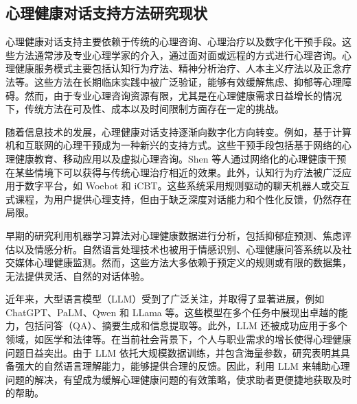 \subsection{心理健康对话支持方法研究现状}

心理健康对话支持主要依赖于传统的心理咨询、心理治疗以及数字化干预手段。这些方法通常涉及专业心理学家的介入，通过面对面或远程的方式进行心理咨询。心理健康服务模式主要包括认知行为疗法、精神分析治疗、人本主义疗法以及正念疗法等\cite{Colby_Ortony_Clore_Collins_1989}\cite{Rogers}。这些方法在长期临床实践中被广泛验证，能够有效缓解焦虑、抑郁等心理障碍。然而，由于专业心理咨询资源有限，尤其是在心理健康需求日益增长的情况下，传统方法在可及性、成本以及时间限制方面存在一定的挑战\cite{Kazdin_Blase_2011}。

随着信息技术的发展，心理健康对话支持逐渐向数字化方向转变。例如，基于计算机和互联网的心理干预成为一种新兴的支持方式。这些干预手段包括基于网络的心理健康教育、移动应用以及虚拟心理咨询。Shen\cite{Shen_Rudzicz_2017} 等人通过网络化的心理健康干预在某些情境下可以获得与传统心理治疗相近的效果。此外，认知行为疗法被广泛应用于数字平台，如 Woebot\cite{Fitzpatrick_Darcy_Vierhile_2017} 和 iCBT\cite{Williams_Andrews_2013}。这些系统采用规则驱动的聊天机器人或交互式课程，为用户提供心理支持，但由于缺乏深度对话能力和个性化反馈，仍然存在局限。

早期的研究利用机器学习算法对心理健康数据进行分析，包括抑郁症预测、焦虑评估以及情感分析\cite{Shen_Rudzicz_2017}。自然语言处理技术也被用于情感识别、心理健康问答系统以及社交媒体心理健康监测\cite{Guntuku_Yaden_Kern_Ungar_Eichstaedt_2017}。然而，这些方法大多依赖于预定义的规则或有限的数据集，无法提供灵活、自然的对话体验。

近年来，大型语言模型（LLM）受到了广泛关注，并取得了显著进展，例如 ChatGPT、PaLM\cite{Chowdhery_Narang_Devlin_Bosma_Mishra_Roberts_Barham_Chung_Sutton_Gehrmann_etal}、Qwen\cite{Bai_Bai_Chu_Cui_Dang_Deng_Fan_Ge_Han_Huang_et} 和 LLama\cite{Touvron_Lavril_Izacard_Martinet_Lachaux_Lacroix_Roziere_Goyal_Hambro_Azhar_et} 等。这些模型在多个任务中展现出卓越的能力，包括问答（QA）、摘要生成和信息提取等。此外，LLM 还被成功应用于多个领域，如医学和法律等\cite{Xiong_Wang_Zhu_Zhao_Liu_Huang_Wang_Shen}。在当前社会背景下，个人与职业需求的增长使得心理健康问题日益突出。由于 LLM 依托大规模数据训练，并包含海量参数，研究表明其具备强大的自然语言理解能力，能够提供合理的反馈。因此，利用 LLM 来辅助心理问题的解决，有望成为缓解心理健康问题的有效策略，使求助者更便捷地获取及时的帮助。

